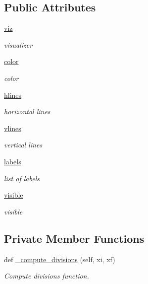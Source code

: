 \subsection*{Public Attributes}
\begin{DoxyCompactItemize}
\item 
\hyperlink{classvisualizer_1_1hud_1_1Axes_a2ef949d1777934b9f320356f5f78f250}{viz}
\begin{DoxyCompactList}\small\item\em visualizer \end{DoxyCompactList}\item 
\hyperlink{classvisualizer_1_1hud_1_1Axes_ad728f986aa77a67a9ac95ee7ce7f56a9}{color}
\begin{DoxyCompactList}\small\item\em color \end{DoxyCompactList}\item 
\hyperlink{classvisualizer_1_1hud_1_1Axes_a0cf5bfdbee64daf149fd3fcb26c7f662}{hlines}
\begin{DoxyCompactList}\small\item\em horizontal lines \end{DoxyCompactList}\item 
\hyperlink{classvisualizer_1_1hud_1_1Axes_a31139415c2a30668137184f4ef88d948}{vlines}
\begin{DoxyCompactList}\small\item\em vertical lines \end{DoxyCompactList}\item 
\hyperlink{classvisualizer_1_1hud_1_1Axes_a8f7a1ac8f65e14502dfb45b127b7b9df}{labels}
\begin{DoxyCompactList}\small\item\em list of labels \end{DoxyCompactList}\item 
\hyperlink{classvisualizer_1_1hud_1_1Axes_ae1618ac7b34eb439fb93ec44f6b55347}{visible}
\begin{DoxyCompactList}\small\item\em visible \end{DoxyCompactList}\end{DoxyCompactItemize}
\subsection*{Private Member Functions}
\begin{DoxyCompactItemize}
\item 
def \hyperlink{classvisualizer_1_1hud_1_1Axes_a0356e26f0e4554399fd97ac81ad4451d}{\+\_\+compute\+\_\+divisions} (self, xi, xf)
\begin{DoxyCompactList}\small\item\em Compute divisions function. \end{DoxyCompactList}\end{DoxyCompactItemize}


